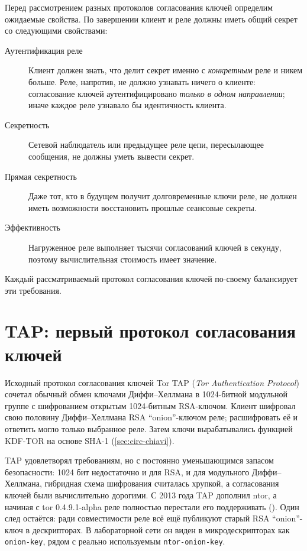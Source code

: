 Перед рассмотрением разных протоколов согласования ключей определим ожидаемые свойства. По завершении клиент и реле должны иметь общий секрет со следующими свойствами:
\begin{description}
  \item[Аутентификация реле] Клиент должен знать, что делит секрет именно с \emph{конкретным} реле и никем больше. Реле, напротив, не должно узнавать ничего о клиенте: согласование ключей аутентифицировано \emph{только в одном направлении}; иначе каждое реле узнавало бы идентичность клиента.
  \item[Секретность] Сетевой наблюдатель или предыдущее реле цепи, пересылающее сообщения, не должны уметь вывести секрет.
  \item[Прямая секретность] Даже тот, кто в будущем получит долговременные ключи реле, не должен иметь возможности восстановить прошлые сеансовые секреты.
  \item[Эффективность] Нагруженное реле выполняет тысячи согласований ключей в секунду, поэтому вычислительная стоимость имеет значение.
\end{description}
Каждый рассматриваемый протокол согласования ключей по-своему балансирует эти требования.

\section{TAP: первый протокол согласования ключей}\label{sec:tap}

Исходный протокол согласования ключей Tor TAP (\emph{Tor Authentication Protocol}) сочетал обычный обмен ключами Диффи--Хеллмана в 1024-битной модульной группе с шифрованием открытым 1024-битным RSA-ключом. Клиент шифровал свою половину Диффи--Хеллмана RSA \enquote{onion}-ключом реле; расшифровать её и ответить могло только выбранное реле. Затем ключи вырабатывались функцией KDF-TOR на основе SHA-1 (\cref{sec:circ-chiavi}).

TAP удовлетворял требованиям, но с постоянно уменьшающимся запасом безопасности: 1024 бит недостаточно и для RSA, и для модульного Диффи--Хеллмана, гибридная схема шифрования считалась хрупкой, а согласования ключей были вычислительно дорогими. С 2013 года TAP дополнил ntor, а начиная с tor 0.4.9.1-alpha реле полностью перестали его поддерживать (). Один след остаётся: ради совместимости реле всё ещё публикуют старый RSA \enquote{onion}-ключ в дескрипторах. В лабораторной сети он виден в микродескрипторах как \texttt{onion-key}, рядом с реально используемым \texttt{ntor-onion-key}.

